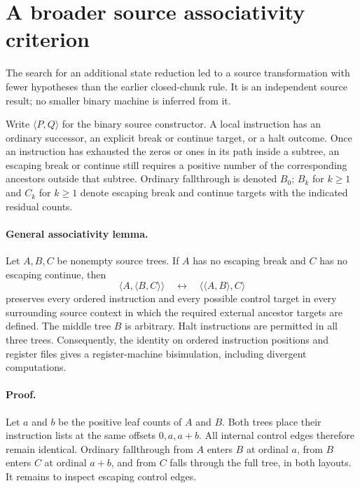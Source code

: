 \section{A broader source associativity criterion}
\label{sec:broad-associativity}

The search for an additional state reduction led to a source transformation
with fewer hypotheses than the earlier closed-chunk rule.  It is an
independent source result; no smaller binary machine is inferred from it.

Write $\langle P,Q\rangle$ for the binary source constructor.  A local
instruction has an ordinary successor, an explicit break or continue
target, or a halt outcome.  Once an instruction has exhausted the zeros
or ones in its path inside a subtree, an escaping break or continue still
requires a positive number of the corresponding ancestors outside that
subtree.  Ordinary fallthrough is denoted $B_0$; $B_k$ for $k\geq1$ and
$C_k$ for $k\geq1$ denote escaping break and continue targets with the
indicated residual counts.

\paragraph{General associativity lemma.}
Let $A,B,C$ be nonempty source trees.  If $A$ has no escaping break and $C$
has no escaping continue, then
\[
 \langle A,\langle B,C\rangle\rangle
 \quad\longleftrightarrow\quad
 \langle\langle A,B\rangle,C\rangle
\]
preserves every ordered instruction and every possible control target in
every surrounding source context in which the required external ancestor
targets are defined.  The middle tree $B$ is arbitrary.
Halt instructions are permitted in all three trees.  Consequently, the
identity on ordered instruction positions and register files gives a
register-machine bisimulation, including divergent computations.

\paragraph{Proof.}
Let $a$ and $b$ be the positive leaf counts of $A$ and $B$.  Both trees
place their instruction lists at the same offsets $0,a,a+b$.
All internal control edges therefore remain identical.  Ordinary
fallthrough from $A$ enters $B$ at ordinal $a$, from $B$ enters $C$ at
ordinal $a+b$, and from $C$ falls through the full tree, in both layouts.
It remains to inspect escaping control edges.

